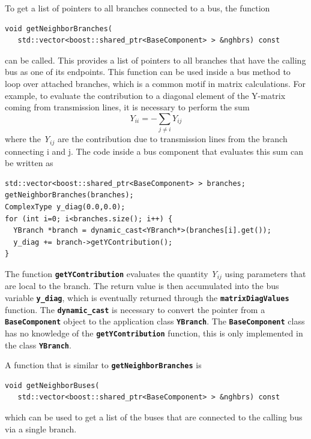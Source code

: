 \documentclass[12pt]{report} %
\begin{document}
To get a list of pointers to all branches connected to a bus, the function

{
\color{red}
\begin{Verbatim}[fontseries=b]
void getNeighborBranches(
   std::vector<boost::shared_ptr<BaseComponent> > &nghbrs) const
\end{Verbatim}
}

can be called. This provides a list of pointers to all branches that have the calling bus as one of its endpoints. This function can be used inside a bus method to loop over attached branches, which is a common motif in matrix calculations. For example, to evaluate the contribution to a diagonal element of the Y-matrix coming from transmission lines, it is necessary to perform the sum\[Y_{ii}=-\sum_{j\neq i}{Y_{ij}}\] 
where the \textit{Y${}_{ij}$ }are the contribution due to transmission lines from the branch connecting i and j. The code inside a bus component that evaluates this sum can be written as

{
\color{red}
\begin{Verbatim}[fontseries=b]
std::vector<boost::shared_ptr<BaseComponent> > branches;
getNeighborBranches(branches);
ComplexType y_diag(0.0,0.0);
for (int i=0; i<branches.size(); i++) {
  YBranch *branch = dynamic_cast<YBranch*>(branches[i].get());
  y_diag += branch->getYContribution();
}
\end{Verbatim}
}

The function \texttt{\textbf{getYContribution}} evaluates the quantity \textit{Y${}_{ij}$ }using parameters that are local to the branch. The return value is then accumulated into the bus variable \texttt{\textbf{y\_diag}}, which is eventually returned through the \texttt{\textbf{matrixDiagValues}} function. The \texttt{\textbf{dynamic\_cast}} is necessary to convert the pointer from a \texttt{\textbf{BaseComponent}} object to the application class \texttt{\textbf{YBranch}}. The \texttt{\textbf{BaseComponent}} class has no knowledge of the \texttt{\textbf{getYContribution}} function, this is only implemented in the class \texttt{\textbf{YBranch}}.

A function that is similar to \texttt{\textbf{getNeighborBranches}} is

{
\color{red}
\begin{Verbatim}[fontseries=b]
void getNeighborBuses(
   std::vector<boost::shared_ptr<BaseComponent> > &nghbrs) const
\end{Verbatim}
}

which can be used to get a list of the buses that are connected to the calling bus via a single branch.
\end{document}
